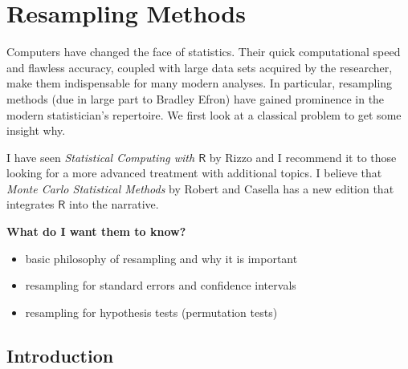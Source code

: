 \documentclass[captions=tableheading]{scrbook}
\begin{document}
\chapter{Resampling Methods}
\label{sec-13}
\label{cha-resampling-methods}


\noindent 
Computers have changed the face of statistics. Their quick computational speed and flawless accuracy, coupled with large data sets acquired by the researcher, make them indispensable for many modern analyses. In particular, resampling methods (due in large part to Bradley Efron) have gained prominence in the modern statistician's repertoire. We first look at a classical problem to get some insight why. 

I have seen \emph{Statistical Computing with \(\mathsf{R}\)} by Rizzo \cite{Rizzo2008} and I recommend it to those looking for a more advanced treatment with additional topics. I believe that \emph{Monte Carlo Statistical Methods} by Robert and Casella \cite{Robert2004} has a new edition that integrates \(\mathsf{R}\) into the narrative.

\textbf{What do I want them to know?}
\begin{itemize}
\item basic philosophy of resampling and why it is important
\item resampling for standard errors and confidence intervals
\item resampling for hypothesis tests (permutation tests)
\end{itemize}
\section{Introduction}
\label{sec-13-1}
\label{sec-Introduction-Resampling}
\end{document}
